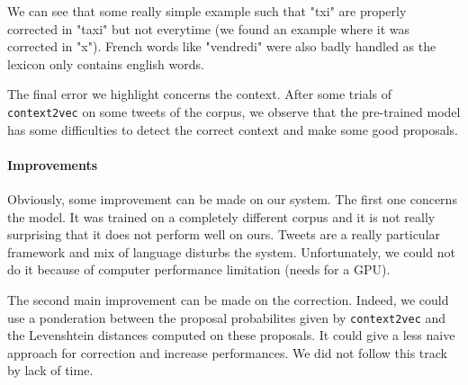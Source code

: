 \documentclass[11pt]{article}
\begin{document}
  We can see that some really simple example such that "txi" are properly corrected in "taxi" but not everytime (we found an example where it was corrected in "x"). French words like "vendredi" were also badly handled as the lexicon only contains english words.

  The final error we highlight concerns the context. After some trials of \texttt{context2vec} on some tweets of the corpus, we observe that the pre-trained model has some difficulties to detect the correct context and make some good proposals.
  
  \paragraph{Improvements} %
  \label{par:improvements}
  Obviously, some improvement can be made on our system. The first one concerns the model. It was trained on a completely different corpus and it is not really surprising that it does not perform well on ours. Tweets are a really particular framework and mix of language disturbs the system. Unfortunately, we could not do it because of computer performance limitation (needs for a GPU).

  The second main improvement can be made on the correction. Indeed, we could use a ponderation between the proposal probabilites given by \texttt{context2vec} and the Levenshtein distances computed on these proposals. It could give a less naive approach for correction and increase performances. We did not follow this track by lack of time.
\end{document}
